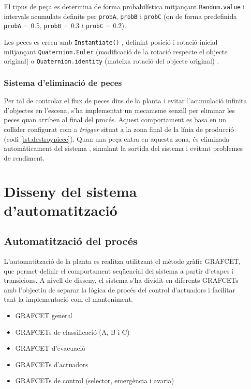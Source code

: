\documentclass[a4paper,11pt,DIV=13,headings=normal,abstract=true,twoside=semi]{article}
\begin{document}
El tipus de peça es determina de forma probabilística mitjançant \texttt{Random.value} i intervals acumulats definits per \texttt{probA}, \texttt{probB} i \texttt{probC} (on de forma predefinida \texttt{probA} = 0.5, \texttt{probB} = 0.3 i \texttt{probC} = 0.2).


Les peces es creen amb \texttt{Instantiate()} \cite{UnityInstantiate}, definint posició i rotació inicial mitjançant \texttt{Quaternion.Euler} (modificació de la rotació respecte el objecte original) o \texttt{Quaternion.identity} (mateixa rotació del objecte original) \cite{UnityQuaternion}.


\subsubsection{Sistema d'eliminació de peces}

Per tal de controlar el flux de peces dins de la planta i evitar l'acumulació infinita d'objectes en l'escena, s'ha implementat un mecanisme senzill per eliminar les peces quan arriben al final del procés. Aquest comportament es basa en un collider configurat com a \textit{trigger} situat a la zona final de la línia de producció (codi \ref{lst:destroypiece}). Quan una peça entra en aquesta zona, és eliminada automàticament del sistema \cite{UnityLearnDestroyI}, simulant la sortida del sistema i evitant problemes de rendiment.

\newpage
\section{Disseny del sistema d'automatització}

\subsection{Automatització del procés}

L'automatització de la planta es realitza utilitzant el mètode gràfic GRAFCET, que permet definir el comportament seqüencial del sistema a partir d'etapes i transicions. A nivell de disseny, el sistema s'ha dividit en diferents GRAFCETs amb l'objectiu de separar la lògica de procés del control d'actuadors i facilitar tant la implementació com el manteniment.

\begin{itemize}
\item GRAFCET general
\item GRAFCETs de classificació (A, B i C)
\item GRAFCET d'evacuació
\item GRAFCETs d'actuadors
\item GRAFCETs de control (selector, emergència i avaria)
\end{itemize}
\end{document}
